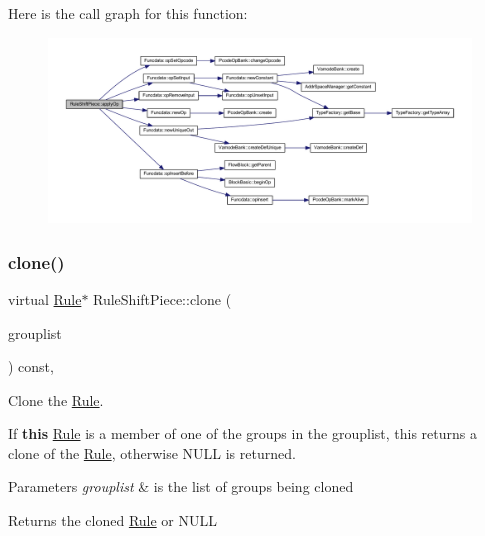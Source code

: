 Here is the call graph for this function\+:
\nopagebreak
\begin{figure}[H]
\begin{center}
\leavevmode
\includegraphics[width=350pt]{class_rule_shift_piece_a6ba7f2b28202933238d037dd1706992c_cgraph}
\end{center}
\end{figure}
\mbox{\label{class_rule_shift_piece_a891c9165fecfdfb57858dca7701889a0}} 
\subsubsection{\texorpdfstring{clone()}{clone()}}
{\footnotesize\ttfamily virtual \mbox{\hyperlink{class_rule}{Rule}}$\ast$ Rule\+Shift\+Piece\+::clone (\begin{DoxyParamCaption}\item[{const \mbox{\hyperlink{class_action_group_list}{Action\+Group\+List}} \&}]{grouplist }\end{DoxyParamCaption}) const\hspace{0.3cm}{\ttfamily [inline]}, {\ttfamily [virtual]}}



Clone the \mbox{\hyperlink{class_rule}{Rule}}. 

If {\bfseries{this}} \mbox{\hyperlink{class_rule}{Rule}} is a member of one of the groups in the grouplist, this returns a clone of the \mbox{\hyperlink{class_rule}{Rule}}, otherwise N\+U\+LL is returned. 
\begin{DoxyParams}{Parameters}
{\em grouplist} & is the list of groups being cloned \\
\hline
\end{DoxyParams}
\begin{DoxyReturn}{Returns}
the cloned \mbox{\hyperlink{class_rule}{Rule}} or N\+U\+LL 
\end{DoxyReturn}


